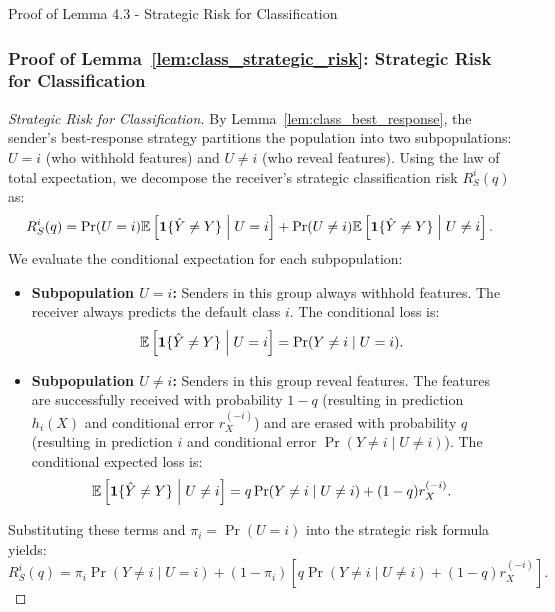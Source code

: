 \begin{sourceblock}{Proof of Lemma 4.3 - Strategic Risk for Classification}
\subsubsection*{Proof of Lemma~\ref{lem:class_strategic_risk}: Strategic Risk for Classification}
\label{app:proof_class_strategic_risk}
\begin{proof}[Strategic Risk for Classification]
By Lemma~\ref{lem:class_best_response}, the sender's best-response strategy partitions the population into two subpopulations: $U = i$ (who withhold features) and $U \ne i$ (who reveal features). Using the law of total expectation, we decompose the receiver's strategic classification risk $R^i_S(q)$ as:
\begin{equation}
    R^i_S(q) = \Pr(U = i) \mathbb{E}\left[ \mathbf{1}\{\hat{Y} \ne Y\} \;\middle|\; U = i \right] + \Pr(U \ne i) \mathbb{E}\left[ \mathbf{1}\{\hat{Y} \ne Y\} \;\middle|\; U \ne i \right].
\end{equation}
We evaluate the conditional expectation for each subpopulation:
\begin{itemize}
    \item \textbf{Subpopulation $U = i$:} Senders in this group always withhold features. The receiver always predicts the default class $i$. The conditional loss is:
    \begin{equation}
        \mathbb{E}\left[ \mathbf{1}\{\hat{Y} \ne Y\} \;\middle|\; U = i \right] = \Pr(Y \ne i \mid U = i).
    \end{equation}
    \item \textbf{Subpopulation $U \ne i$:} Senders in this group reveal features. The features are successfully received with probability $1 - q$ (resulting in prediction $h_i(X)$ and conditional error $r^{(-i)}_X$) and are erased with probability $q$ (resulting in prediction $i$ and conditional error $\Pr(Y \ne i \mid U \ne i)$). The conditional expected loss is:
    \begin{equation}
        \mathbb{E}\left[ \mathbf{1}\{\hat{Y} \ne Y\} \;\middle|\; U \ne i \right] = q\Pr(Y \ne i \mid U \ne i) + (1 - q)r^{(-i)}_X.
    \end{equation}
\end{itemize}
Substituting these terms and $\pi_i = \Pr(U = i)$ into the strategic risk formula yields:
\begin{equation}
    \label{eq:class_risk_deriv_intermediate}
    R^i_S(q) = \pi_i \Pr(Y \ne i \mid U = i) + (1 - \pi_i) \left[ q \Pr(Y \ne i \mid U \ne i) + (1 - q)r^{(-i)}_X \right].

\end{equation}
\end{proof}
\end{sourceblock}

